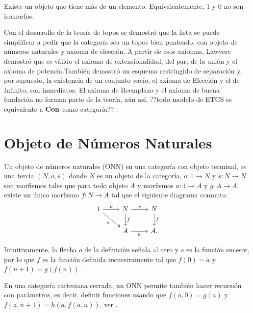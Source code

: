 \begin{axiom}
Existe un objeto que tiene más de un elemento. Equivalentemente,
$1$ y $0$ no son isomorfos.
\end{axiom}

Con el desarrollo de la teoría de topos se demostró que la lista se puede simplificar a pedir
que la categoría sea un topos bien punteado, con objeto de números naturales y axioma de elección.
A partir de esos axiomas, Lawvere demostró que es válido el axioma de extensionalidad, del par, de la unión
y el axioma de potencia.También demostró un esquema restringido de separación y, por supuesto, la existencia
de un conjunto vacío, el axioma de Elección y el de Infinito, son inmediatos. El axioma de Reemplazo y el
axioma de buena fundación no forman parte de la teoría, aún así, ??todo modelo de ETCS es
equivalente a $\mathbf{Con}$ como categoría?? \cite{lawvere1964elementary}.



\section{Objeto de Números Naturales}
\begin{definition}
  Un objeto de números naturales (ONN) en una categoría con objeto terminal, es una tercia $(N,o,s)$
  donde $N$ es un objeto de la categoría, $o\colon 1\to N$ y $s\colon N\to N$ son morfismos tales que para todo
  objeto $A$ y morfismos $a\colon 1\to A$ y $g\colon A\to A$ existe un único morfismo $f\colon N\to A$ tal que
  el siguiente diagrama conmuta:
  \begin{equation*}
    \begin{tikzcd}
      1\ar{r}{o}\ar[swap]{rd}{a} & N\ar{d}{f}\ar{r}{s} & N\ar{d}{f} \\
      & A\ar[swap]{r}{g} & A.
    \end{tikzcd}
  \end{equation*}
\end{definition}

Intuitivamente, la flecha $o$ de la definición señala al cero y $s$ es la función sucesor, por lo que
$f$ es la función definida recursivamente tal que $f(0)=a$ y $f(n+1)=g(f(n))$.

En una categoría cartesiana cerrada, un ONN permite también hacer recursión con parámetros,
es decir, definir funciones usando que $f(a,0)=g(a)$ y $f(a,n+1)=h(a,f(a,n))$, ver \cite{johnstone2002sketches}.

